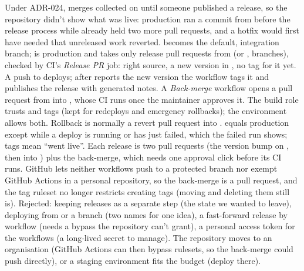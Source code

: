   {Under ADR-024, merges collected on  until someone published a release, so the
   repository didn't show what was live: production ran a commit from before the release process
   while  already held two more pull requests, and a hotfix would first have needed
   that unreleased work reverted.}
  { becomes the default, integration branch;  is production and takes only
   release pull requests from  (or ,  branches), checked by
   CI's \emph{Release PR} job: right source, a new version in , no tag for it
   yet. A push to  deploys; after  reports the new version the
   workflow tags it and publishes the release with generated notes. A \emph{Back-merge} workflow
   opens a pull request from  into , whose CI runs once the maintainer
   approves it. The build role
   trusts  and  tags (kept for redeploys and emergency rollbacks); the
    environment allows both. Rollback is normally a revert pull request into
   .}
  { equals production except while a deploy is running or has just failed, which
   the failed run shows; tags mean ``went live''. Each release is two pull requests (the version
   bump on , then  into ) plus the back-merge, which needs one
   approval click before its CI runs. GitHub lets
   neither workflows push to a protected branch nor exempt GitHub Actions in a personal
   repository, so the back-merge is a pull request, and the tag ruleset no longer restricts
   creating tags (moving and deleting them still is). Rejected: keeping releases as a separate
   step (the state we wanted to leave), deploying from  or a  branch
   (two names for one idea), a fast-forward release by workflow (needs a bypass the repository
   can't grant), a personal access token for the workflows (a long-lived secret to manage).}
  {The repository moves to an organisation (GitHub Actions can then bypass rulesets, so the
   back-merge could push directly), or a staging environment fits the budget (deploy 
   there).}

